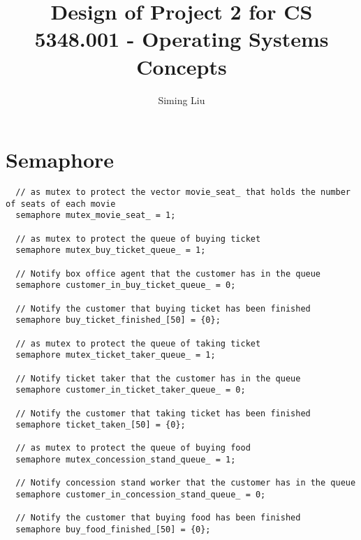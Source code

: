 \documentclass[a4paper]{report}
\begin{document}
\title{Design of Project 2 for CS 5348.001 - Operating Systems Concepts}

\author{Siming Liu}

\maketitle{}

\section*{Semaphore}
\begin{lstlisting}
  // as mutex to protect the vector movie_seat_ that holds the number of seats of each movie
  semaphore mutex_movie_seat_ = 1;

  // as mutex to protect the queue of buying ticket
  semaphore mutex_buy_ticket_queue_ = 1;

  // Notify box office agent that the customer has in the queue
  semaphore customer_in_buy_ticket_queue_ = 0;

  // Notify the customer that buying ticket has been finished
  semaphore buy_ticket_finished_[50] = {0};

  // as mutex to protect the queue of taking ticket
  semaphore mutex_ticket_taker_queue_ = 1;

  // Notify ticket taker that the customer has in the queue
  semaphore customer_in_ticket_taker_queue_ = 0;

  // Notify the customer that taking ticket has been finished
  semaphore ticket_taken_[50] = {0};

  // as mutex to protect the queue of buying food
  semaphore mutex_concession_stand_queue_ = 1;

  // Notify concession stand worker that the customer has in the queue
  semaphore customer_in_concession_stand_queue_ = 0;

  // Notify the customer that buying food has been finished
  semaphore buy_food_finished_[50] = {0};
\end{lstlisting}
\end{document}
